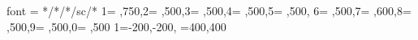 \usepackage[tracking=true,expansion=true,stretch=15,shrink=15]{microtype}
{ font = */*/*/sc/* }
{1={ ,750},2={ ,500},3={ ,500},4={ ,500},5={ ,500},
  6={ ,500},7={ ,600},8={ ,500},9={ ,500},0={ ,500}}
{1={-200,-200},
  \textendash={400,400}}